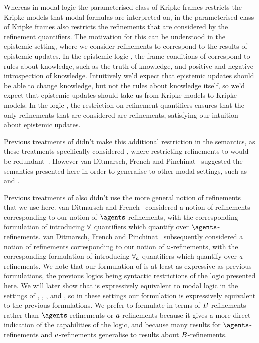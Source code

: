 Whereas in modal logic the parameterised class of Kripke frames restricts the Kripke models that modal formulas are interpreted on, in \logicRml{} the parameterised class of Kripke frames also restricts the refinements that are considered by the refinement quantifiers.
The motivation for this can be understood in the epistemic setting, where we consider refinements to correspond to the results of epistemic updates.
In the epistemic logic \logicS{}, the frame conditions of \classS{} correspond to rules about knowledge, such as the truth of knowledge, and positive and negative introspection of knowledge.
Intuitively we'd expect that epistemic updates should be able to change knowledge, but not the rules about knowledge itself, so we'd expect that epistemic updates should take us from \classS{} Kripke models to \classS{} Kripke models.
In the logic \logicRmlS{}, the restriction on refinement quantifiers ensures that the only refinements that are considered are \classS{} refinements, satisfying our intuition about epistemic updates.

Previous treatments of \logicRml{} didn't make this additional restriction in the semantics, as these treatments specifically considered \logicRmlK{}, where restricting refinements to \classK{} would be redundant~\cite{vanditmarsch:2009,vanditmarsch:2010}.
However van Ditmarsch, French and Pinchinat~\cite{vanditmarsch:2010} suggested the semantics presented here in order to generalise \logicRml{} to other modal settings, such as \classS{} and \classKF{}.   

Previous treatments of \logicRml{} also didn't use the more general notion of refinements that we use here.
van Ditmarsch and French~\cite{vanditmarsch:2009} considered a notion of refinements corresponding to our notion of $\agents$-refinements, with the corresponding formulation of \logicRml{} introducing $\allrefs$ quantifiers which quantify over $\agents$-refinements.
van Ditmarsch, French and Pinchinat~\cite{vanditmarsch:2010} subsequently considered a notion of refinements corresponding to our notion of $a$-refinements, with the corresponding formulation of \logicRml{} introducing ${\forall_{a}}$ quantifiers which quantify over $a$-refinements.
We note that our formulation of \logicRml{} is at least as expressive as previous formulations, the previous logics being syntactic restrictions of the logic presented here.
We will later show that \logicRml{} is expressively equivalent to modal logic in the settings of \classK{}, \classKFF{}, \classKD{}, and \classS{}, so in these settings our formulation is expressively equivalent to the previous formulations.
We prefer to formulate \logicRml{} in terms of $B$-refinements rather than $\agents$-refinements or $a$-refinements because it gives a more direct indication of the capabilities of the logic, and because many results for $\agents$-refinements and $a$-refinements generalise to results about $B$-refinements.

